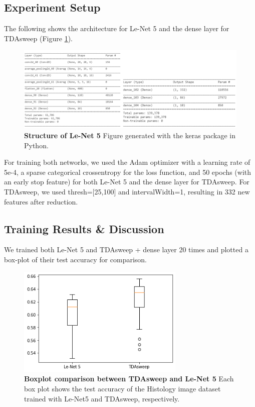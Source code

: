 \documentclass{article}
\begin{document}
\subsection{Experiment Setup}

The following shows the architecture for Le-Net 5 and the dense layer for TDAsweep (Figure \ref{struct}).

\begin{figure}[!ht]
\centering
\includegraphics[width=17cm]{struct.PNG}
\caption{{\bf Structure of Le-Net 5} Figure generated with the keras package in Python.}
\label{struct}
\end{figure}


For training both networks, we used the Adam optimizer with a learning rate of 5e-4, a sparse categorical crossentropy for the loss function, and 50 epochs (with an early stop feature) for both Le-Net 5 and the dense layer for TDAsweep. For TDAsweep, we used thresh=[25,100] and intervalWidth=1, resulting in 332 new features after reduction.


\subsection{Training Results \& Discussion}

We trained both Le-Net 5 and TDAsweep + dense layer 20 times and plotted a box-plot of their test accuracy for comparison. 

\begin{figure}[!ht]
\centering
\includegraphics[width=8cm]{lenet_vs_tdasweep.png}
\caption{{\bf Boxplot comparison between TDAsweep and Le-Net 5} Each box plot shows the test accuracy of the Histology image dataset trained with Le-Net5 and TDAsweep, respectively.}
\label{lenet_tdasweep}
\end{figure}
\end{document}
